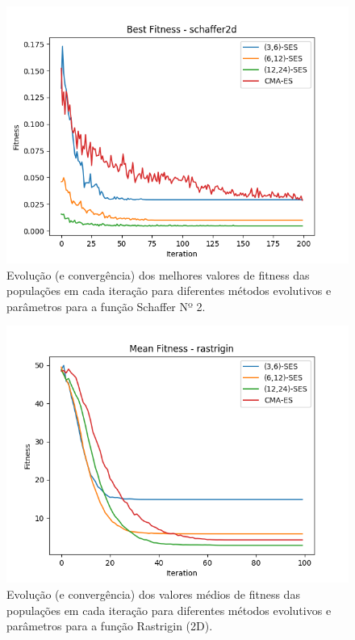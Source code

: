\documentclass[conference]{IEEEtran}
\begin{document}
\begin{figure}[htbp]
\centering
\centerline{\includegraphics[scale=0.5]{imagens/schaffer2d/best_fitness.png}}
\caption{Evolução (e convergência) dos melhores valores de fitness das populações em cada iteração para diferentes métodos evolutivos e parâmetros para a função Schaffer Nº 2.}
\label{schaffer2d/best_fitness}
\end{figure}

\begin{figure}[htbp]
\centering
\centerline{\includegraphics[scale=0.5]{imagens/rastrigin/mean_fitness.png}}
\caption{Evolução (e convergência) dos valores médios de fitness das populações em cada iteração para diferentes métodos evolutivos e parâmetros para a função Rastrigin (2D).}
\label{rastrigin/mean_fitness}
\end{figure}
\end{document}
